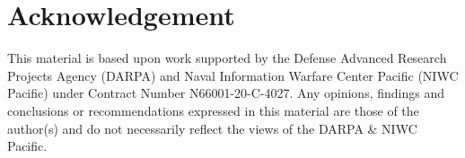\section{Acknowledgement}

This material is based upon work supported by the Defense Advanced
Research Projects Agency (DARPA) and Naval Information Warfare Center
Pacific (NIWC Pacific) under Contract Number N66001-20-C-4027. Any
opinions, findings and conclusions or recommendations expressed in this
material are those of the author(s) and do not necessarily reflect the
views of the DARPA \& NIWC Pacific. 

